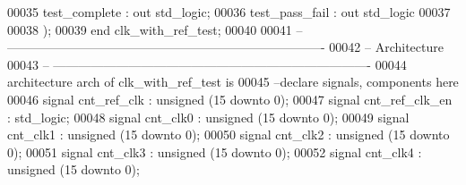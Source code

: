 \begin{DoxyCode}
00035           \textcolor{vhdlchar}{test_complete} \textcolor{vhdlchar}{:} \textcolor{keywordflow}{out} \textcolor{comment}{std\_logic};
00036           \textcolor{vhdlchar}{test_pass_fail}    \textcolor{vhdlchar}{:} \textcolor{keywordflow}{out} \textcolor{comment}{std\_logic}
00037      
00038         \textcolor{vhdlchar}{)};
00039 \textcolor{keywordflow}{end} \textcolor{vhdlchar}{clk\_with\_ref\_test};
00040 
00041 \textcolor{keyword}{-- ----------------------------------------------------------------------------}
00042 \textcolor{keyword}{-- Architecture}
00043 \textcolor{keyword}{-- ----------------------------------------------------------------------------}
00044 \textcolor{keywordflow}{architecture} arch \textcolor{keywordflow}{of} clk_with_ref_test is
00045 \textcolor{keyword}{--declare signals,  components here}
00046 \textcolor{keywordflow}{signal} \textcolor{vhdlchar}{cnt_ref_clk}          \textcolor{vhdlchar}{:} \textcolor{comment}{unsigned} \textcolor{vhdlchar}{(}\textcolor{vhdllogic}{}\textcolor{vhdllogic}{15} \textcolor{keywordflow}{downto} \textcolor{vhdllogic}{}\textcolor{vhdllogic}{0}\textcolor{vhdlchar}{)};
00047 \textcolor{keywordflow}{signal} \textcolor{vhdlchar}{cnt_ref_clk_en}       \textcolor{vhdlchar}{:} \textcolor{comment}{std\_logic}; 
00048 \textcolor{keywordflow}{signal} \textcolor{vhdlchar}{cnt_clk0}             \textcolor{vhdlchar}{:} \textcolor{comment}{unsigned} \textcolor{vhdlchar}{(}\textcolor{vhdllogic}{}\textcolor{vhdllogic}{15} \textcolor{keywordflow}{downto} \textcolor{vhdllogic}{}\textcolor{vhdllogic}{0}\textcolor{vhdlchar}{)};
00049 \textcolor{keywordflow}{signal} \textcolor{vhdlchar}{cnt_clk1}             \textcolor{vhdlchar}{:} \textcolor{comment}{unsigned} \textcolor{vhdlchar}{(}\textcolor{vhdllogic}{}\textcolor{vhdllogic}{15} \textcolor{keywordflow}{downto} \textcolor{vhdllogic}{}\textcolor{vhdllogic}{0}\textcolor{vhdlchar}{)};
00050 \textcolor{keywordflow}{signal} \textcolor{vhdlchar}{cnt_clk2}             \textcolor{vhdlchar}{:} \textcolor{comment}{unsigned} \textcolor{vhdlchar}{(}\textcolor{vhdllogic}{}\textcolor{vhdllogic}{15} \textcolor{keywordflow}{downto} \textcolor{vhdllogic}{}\textcolor{vhdllogic}{0}\textcolor{vhdlchar}{)};
00051 \textcolor{keywordflow}{signal} \textcolor{vhdlchar}{cnt_clk3}             \textcolor{vhdlchar}{:} \textcolor{comment}{unsigned} \textcolor{vhdlchar}{(}\textcolor{vhdllogic}{}\textcolor{vhdllogic}{15} \textcolor{keywordflow}{downto} \textcolor{vhdllogic}{}\textcolor{vhdllogic}{0}\textcolor{vhdlchar}{)};
00052 \textcolor{keywordflow}{signal} \textcolor{vhdlchar}{cnt_clk4}             \textcolor{vhdlchar}{:} \textcolor{comment}{unsigned} \textcolor{vhdlchar}{(}\textcolor{vhdllogic}{}\textcolor{vhdllogic}{15} \textcolor{keywordflow}{downto} \textcolor{vhdllogic}{}\textcolor{vhdllogic}{0}\textcolor{vhdlchar}{)};

\end{DoxyCode}
